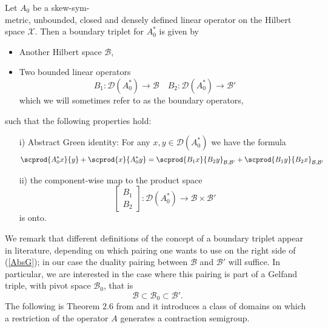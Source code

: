 \documentclass{ifacconf}
\begin{document}
\begin{defn}\label{BouTr}
    Let $A_0$ be a skew-sym-\\ metric, unbounded, closed and densely defined linear operator on the Hilbert space $\mathcal{X}$. Then a boundary triplet for $A_0^*$ is given by 
    \begin{itemize}
        \item Another Hilbert space $\mathcal{B}$,
        \item Two bounded linear operators
        \[B_1:\mathcal{D}(A_0^*)\rightarrow \mathcal{B}\quad B_2:\mathcal{D}(A_0^*)\rightarrow \mathcal{B}'\]
        which we will sometimes refer to as the boundary operators,
    \end{itemize}
    such that the following properties hold:
    \begin{itemize}
        \item[i)] Abstract Green identity: For any $x,y\in \mathcal{D}(A_0^*)$ we have the formula
        \begin{equation}\label{AbsG}\scprod{A_0^*x}{y}+\scprod{x}{A_0^*y}=\scprod{B_1x}{B_2y}_{\mathcal{B},\mathcal{B}'}+\scprod{B_1y}{B_2x}_{\mathcal{B},\mathcal{B}'}\end{equation}
        \item[ii)] the component-wise map to the product space
        \[\begin{bmatrix}
            B_1 \\
            B_2
        \end{bmatrix}:\mathcal{D}(A_0^*)\longrightarrow \mathcal{B}\times\mathcal{B}'\]
        is onto.
    \end{itemize}
\end{defn}
We remark that different definitions of the concept of  a boundary triplet appear in literature, depending on which pairing one wants to use on the right side of (\ref{AbsG}); in our case the duality pairing between $\mathcal{B}$ and $\mathcal{B}'$ will suffice. In particular, we are interested in the case where this pairing is part of a Gelfand triple, with pivot space $\mathcal{B}_0$, that is
\begin{equation}\label{gelf}
    \mathcal{B}\subset\mathcal{B}_0\subset\mathcal{B}'.
\end{equation}
The following is Theorem $2.6$ from \cite{KZ:15} and it introduces a class of domains on which a restriction of the operator $A$ generates a contraction semigroup.
\end{document}
